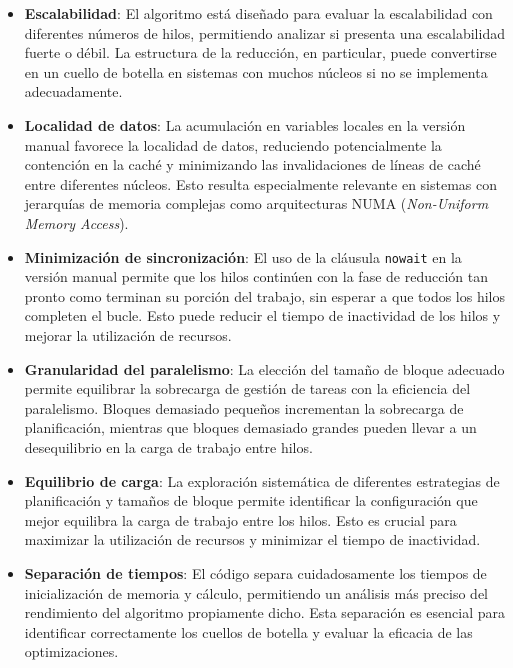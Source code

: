         \begin{itemize}
        
            \item \textbf{Escalabilidad}: El algoritmo está diseñado para evaluar la escalabilidad con diferentes números de hilos, permitiendo analizar si presenta una escalabilidad fuerte o débil. La estructura de la reducción, en particular, puede convertirse en un cuello de botella en sistemas con muchos núcleos si no se implementa adecuadamente.
            
            \item \textbf{Localidad de datos}: La acumulación en variables locales en la versión manual favorece la localidad de datos, reduciendo potencialmente la contención en la caché y minimizando las invalidaciones de líneas de caché entre diferentes núcleos. Esto resulta especialmente relevante en sistemas con jerarquías de memoria complejas como arquitecturas NUMA (\textit{Non-Uniform Memory Access}).
            
            \item \textbf{Minimización de sincronización}: El uso de la cláusula \texttt{nowait} en la versión manual permite que los hilos continúen con la fase de reducción tan pronto como terminan su porción del trabajo, sin esperar a que todos los hilos completen el bucle. Esto puede reducir el tiempo de inactividad de los hilos y mejorar la utilización de recursos.
            
            \item \textbf{Granularidad del paralelismo}: La elección del tamaño de bloque adecuado permite equilibrar la sobrecarga de gestión de tareas con la eficiencia del paralelismo. Bloques demasiado pequeños incrementan la sobrecarga de planificación, mientras que bloques demasiado grandes pueden llevar a un desequilibrio en la carga de trabajo entre hilos.
            
            \item \textbf{Equilibrio de carga}: La exploración sistemática de diferentes estrategias de planificación y tamaños de bloque permite identificar la configuración que mejor equilibra la carga de trabajo entre los hilos. Esto es crucial para maximizar la utilización de recursos y minimizar el tiempo de inactividad.
            
            \item \textbf{Separación de tiempos}: El código separa cuidadosamente los tiempos de inicialización de memoria y cálculo, permitiendo un análisis más preciso del rendimiento del algoritmo propiamente dicho. Esta separación es esencial para identificar correctamente los cuellos de botella y evaluar la eficacia de las optimizaciones.
            

\end{itemize}
